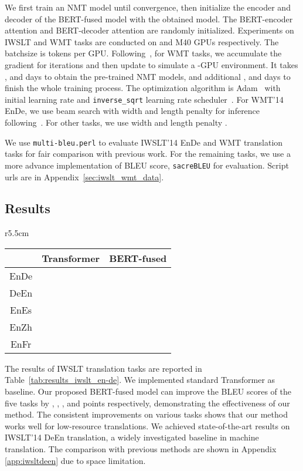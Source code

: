 \documentclass{article} \usepackage{iclr2020_conference,times}
\begin{document}
 We first train an NMT model until convergence, then initialize the encoder and decoder of the BERT-fused model  with the obtained model. The BERT-encoder attention and BERT-decoder attention are randomly initialized. Experiments on IWSLT and WMT tasks are conducted on  and  M40 GPUs respectively. The batchsize is  tokens per GPU. Following~\citep{ott2018scaling}, for WMT tasks, we accumulate the gradient for  iterations and then update to simulate a -GPU environment. It takes ,  and  days to obtain the pre-trained NMT models, and additional ,  and  days to finish the whole training process. The optimization algorithm is Adam~\citep{kingma2014adam} with initial learning rate  and \texttt{inverse\_sqrt} learning rate scheduler~\citep{vaswani2017attention}. For WMT'14 EnDe, we use beam search with width  and length penalty  for inference following~\citep{vaswani2017attention}. For other tasks, we use width  and length penalty .

We use \texttt{multi-bleu.perl} to evaluate IWSLT'14 EnDe and WMT translation tasks for fair comparison with previous work. For the remaining tasks, we use a more advance implementation of BLEU score, \texttt{sacreBLEU} for evaluation. Script urls are in Appendix~\ref{sec:iwslt_wmt_data}.

\subsection{Results}

\begin{wraptable}{r}{5.5cm}
\vspace{-0.6cm}
\small
\centering
\caption{BLEU of all IWSLT  tasks.}
\begin{tabular}{c c c }
\toprule
& Transformer & BERT-fused  \\
\midrule
EnDe &  &  \\
DeEn &  &   \\
EnEs &  &  \\
EnZh &  &  \\
EnFr &  &  \\
\bottomrule
\end{tabular}
\label{tab:results_iwslt_en-de}
\end{wraptable}

The results of IWSLT translation tasks are reported in Table~\ref{tab:results_iwslt_en-de}. We implemented standard Transformer as baseline. Our proposed BERT-fused model can improve the BLEU scores of the five tasks by , , ,  and  points respectively, demonstrating the effectiveness of our method. The consistent improvements on various tasks shows that our method works well for low-resource translations. We achieved state-of-the-art results on IWSLT'14 DeEn translation, a widely investigated baseline in machine translation. The comparison with previous methods are shown in Appendix \ref{app:iwsltdeen} due to space limitation. 
\end{document}
